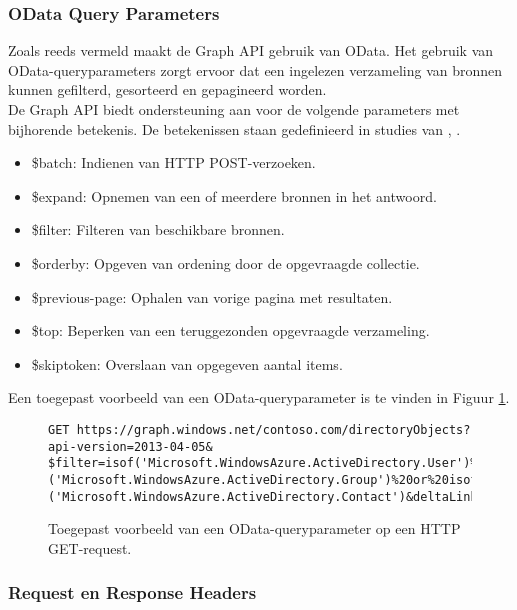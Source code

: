 \subsubsection{OData Query Parameters}

Zoals reeds vermeld maakt de Graph \ac{API} gebruik van OData. Het gebruik van OData-queryparameters zorgt ervoor dat een ingelezen verzameling van bronnen kunnen gefilterd, gesorteerd en gepagineerd worden. \\

De Graph \ac{API} biedt ondersteuning aan voor de volgende parameters met bijhorende betekenis. De betekenissen staan gedefinieerd in studies van \textcite{Liang2016}, \textcite{Wojcieszyn2014}. 

\begin{itemize}
    \item \$batch: Indienen van \ac{HTTP} POST-verzoeken.
    \item \$expand: Opnemen van een of meerdere bronnen in het antwoord.
    \item \$filter: Filteren van beschikbare bronnen.
    \item \$orderby: Opgeven van ordening door de opgevraagde collectie.
    \item \$previous-page: Ophalen van vorige pagina met resultaten.
    \item \$top: Beperken van een teruggezonden opgevraagde verzameling.
    \item \$skiptoken: Overslaan van opgegeven aantal items.
\end{itemize}

Een toegepast voorbeeld van een OData-queryparameter is te vinden in Figuur \ref{odqp}. \\

\begin{figure}[h]
\footnotesize\begin{verbatim}GET https://graph.windows.net/contoso.com/directoryObjects?api-version=2013-04-05&
$filter=isof('Microsoft.WindowsAzure.ActiveDirectory.User')%20or%20isof
('Microsoft.WindowsAzure.ActiveDirectory.Group')%20or%20isof
('Microsoft.WindowsAzure.ActiveDirectory.Contact')&deltaLink=HTTP/1.1
\end{verbatim}    
\caption[Voorbeeld OData-queryparamter]{Toegepast voorbeeld van een OData-queryparameter op een \ac{HTTP} GET-request.}
\label{odqp}
\end{figure}

\subsubsection{Request en Response Headers}

